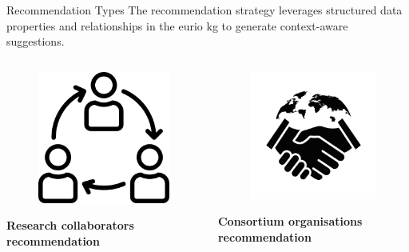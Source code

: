 \begin{tframe}{Recommendation Types}
The recommendation strategy leverages structured data properties and relationships in the \gls{eurio} \gls{kg} to generate context-aware suggestions.

\vspace{0.5cm}

\begin{columns}
    \begin{column}{0.48\textwidth}
      \begin{figure}
        \centering
        \includegraphics[width=.4\linewidth]{../img/architecture/strategy-collaborators.png}
      \end{figure}
      \centering
      \textbf{Research collaborators recommendation}
    \end{column}
    \begin{column}{0.48\textwidth}
      \begin{figure}
        \centering
        \includegraphics[width=.4\linewidth]{../img/architecture/strategy-consortium.png}
      \end{figure}
      \centering
      \textbf{Consortium organisations recommendation}
    \end{column}
  \end{columns}
\end{tframe}